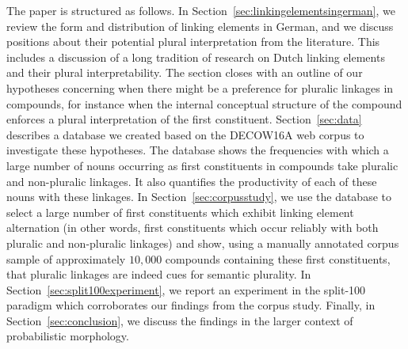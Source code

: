 The paper is structured as follows.
In Section~\ref{sec:linkingelementsingerman}, we review the form and distribution of linking elements in German, and we discuss positions about their potential plural interpretation from the literature.
This includes a discussion of a long tradition of research on Dutch linking elements and their plural interpretability.
The section closes with an outline of our hypotheses concerning when there might be a preference for pluralic linkages in compounds, for instance when the internal conceptual structure of the compound enforces a plural interpretation of the first constituent.
Section~\ref{sec:data} describes a database we created based on the DECOW16A web corpus to investigate these hypotheses.
The database shows the frequencies with which a large number of nouns occurring as first constituents in compounds take pluralic and non-pluralic linkages.
It also quantifies the productivity of each of these nouns with these linkages.
In Section~\ref{sec:corpusstudy}, we use the database to select a large number of first constituents which exhibit linking element alternation (in other words, first constituents which occur reliably with both pluralic and non-pluralic linkages) and show, using a manually annotated corpus sample of approximately $10,000$ compounds containing these first constituents, that pluralic linkages are indeed cues for semantic plurality.
In Section~\ref{sec:split100experiment}, we report an experiment in the split-100 paradigm which corroborates our findings from the corpus study.
Finally, in Section~\ref{sec:conclusion}, we discuss the findings in the larger context of probabilistic morphology.

